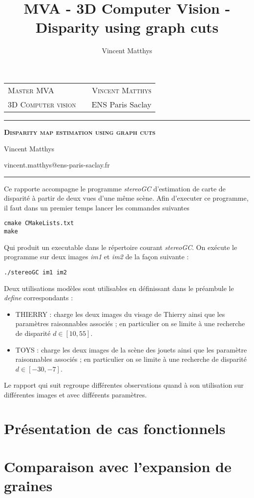 \documentclass[12pt,a4paper,onecolumn]{article}
\title{MVA - 3D Computer Vision - Disparity using graph cuts}
\author{Vincent Matthys}
\begin{document}
\begin{tabularx}{0.9\textwidth}{@{} l X r @{} }
	{\textsc{Master MVA}}       &  & \textsc{Vincent Matthys} \\
	\textsc{3D Computer vision} &  & {ENS Paris Saclay}       \\
\end{tabularx}
\vspace{1.5cm}
\begin{center}

	\rule[11pt]{5cm}{0.5pt}

	\textbf{\LARGE \textsc{Disparity map estimation using graph cuts}}
	\vspace{0.5cm}

	Vincent Matthys

	vincent.matthys@ens-paris-saclay.fr

	\rule{5cm}{0.5pt}

	\vspace{1.5cm}
\end{center}

\tableofcontents

\clearpage

Ce rapporte accompagne le programme \textit{stereoGC} d'estimation de carte de disparité à partir de deux vues d'une même scène. Afin d'executer ce programme, il faut dans un premier temps lancer les commandes suivantes

\begin{lstlisting}[numbers = none]
cmake CMakeLists.txt
make
\end{lstlisting}

Qui produit un executable dans le répertoire courant \textit{stereoGC}. On exécute le programme sur deux images \textit{im1} et \textit{im2} de la façon suivante :

\begin{lstlisting}[numbers = none]
./stereoGC im1 im2
\end{lstlisting}

Deux utilisations modèles sont utilisables en définissant dans le préambule le \textit{define} correspondants :
\begin{itemize}
	\item THIERRY : charge les deux images du visage de Thierry ainsi que les paramètres raisonnables associés ; en particulier on se limite à une recherche de disparité \(d \in [10, 55]\).
	\item TOYS : charge les deux images de la scène des jouets ainsi que les paramètre raisonnables associés  ; en particulier on se limite à une recherche de disparité \(d \in [-30, -7]\).
\end{itemize}

Le rapport qui suit regroupe différentes observations quand à son utilisation sur différentes images et avec différents paramètres.

\section{Présentation de cas fonctionnels}


\section{Comparaison avec l'expansion de graines}
\end{document}
